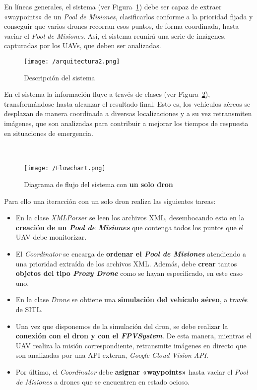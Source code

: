 En líneas generales, el sistema (ver Figura~\ref{fig:descripcion}) debe ser capaz de extraer «waypoints» de un \textit{Pool de Misiones}, clasificarlos conforme a la prioridad fijada y conseguir que varios drones recorran esos puntos, de forma coordinada, hasta vaciar el \textit{Pool de Misiones}. Así, el sistema reunirá una serie de imágenes, capturadas por los \acs{UAV}s, que deben ser analizadas. \\
 
\begin{figure}[!h]
\begin{center}
\texttt{[image: /arquitectura2.png]}
\caption[Descripción del sistema]{Descripción del sistema}
\label{fig:descripcion}
\end{center}
\end{figure}

En el sistema la información fluye a través de clases (ver Figura~\ref{fig:diagflujo}), transformándose hasta alcanzar el resultado final. Esto es, los vehículos aéreos se desplazan de manera coordinada a diversas localizaciones y a su vez retransmiten imágenes, que son analizadas para contribuir a mejorar los tiempos de respuesta en situaciones de emergencia. \\ \\ \\

\begin{figure}[!h]
\begin{center}
\texttt{[image: /Flowchart.png]}
\caption[Diagrama de flujo del sistema con un solo dron]{Diagrama de flujo del sistema con \textbf{un solo dron}}
\label{fig:diagflujo}
\end{center}
\end{figure}

Para ello una iteracción con un solo dron realiza las siguientes tareas:
\begin{itemize}
\item En la clase \textit{XMLParser} se leen los archivos XML, desembocando esto en la \textbf{creación de un \textit{Pool de Misiones}} que contenga todos los puntos que el \acs{UAV} debe monitorizar.
\item El \textit{Coordinator} se encarga de \textbf{ordenar el \textit{Pool de Misiones}} atendiendo a una prioridad extraída de los archivos XML. Además, debe \textbf{crear} tantos \textbf{objetos del tipo \textit{Proxy Drone}} como se hayan especificado, en este caso uno.
\item En la clase \textit{Drone} se obtiene una \textbf{simulación del vehículo aéreo}, a través de \acs{SITL}.
\item Una vez que disponemos de la simulación del dron, se debe realizar la \textbf{conexión con el dron y con el \textit{FPVSystem}}. De esta manera, mientras el \acs{UAV} realiza la misión correspondiente, retransmite imágenes en directo que son analizadas por una \acs{API} externa, \textit{Google Cloud Vision \acs{API}}.
\item Por último, el \textit{Coordinator} debe \textbf{asignar «waypoints»} hasta vaciar el \textit{Pool de Misiones} a drones que se encuentren en estado ocioso.
\end{itemize}

